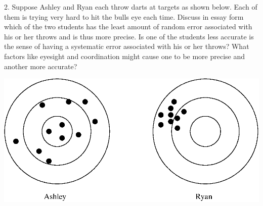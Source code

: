 2. Suppose Ashley and Ryan each throw darts at targets as shown below. Each
of them is trying very hard to hit the bulls eye each time. Discuss in essay
form which of the two students has the least amount of random
error associated with his
or her throws and is thus more precise. Is one of the students less accurate
is the sense of having a systematic error associated with his or her throws?
What factors like eyesight and coordination might cause one to be more precise
and another more accurate?

\vspace{0.3cm}
{\par\centering \includegraphics{measurement_uncertainty/measurement_uncertainty_fig1.eps} \par}
\vspace{0.3cm}

